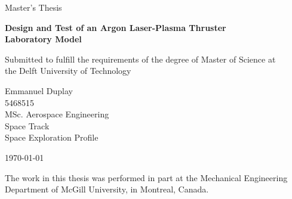 \begin{titlepage}
    \thispagestyle{empty}
    \sffamily
    \vspace*{3cm}
    {\large \color{cyan}
        Master's Thesis
    }

    \vspace{0.3cm}
    \textbf{{\LARGE Design and Test of an Argon Laser-Plasma Thruster\\Laboratory Model}}

    \vspace{0.2cm}
    {\large 
        Submitted to fulfill the requirements of the degree of Master of Science at\\the Delft University of Technology

        \vspace{1cm}
        Emmanuel Duplay \\
        5468515 \\
        MSc. Aerospace Engineering \\
        Space Track \\
        Space Exploration Profile

        \vspace{0.5cm}
        \today
    }
    \vfill
    {   
        The work in this thesis was performed in part at the Mechanical Engineering Department of McGill University, in Montreal, Canada.
        
}
\end{titlepage}
